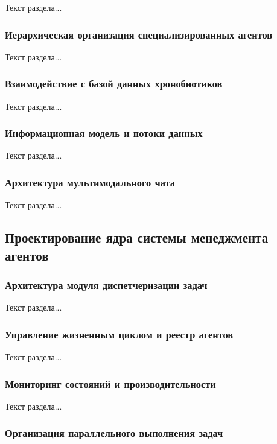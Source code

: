 Текст раздела...

\subsubsection{Иерархическая организация специализированных агентов}

Текст раздела...

\subsubsection{Взаимодействие с базой данных хронобиотиков}

Текст раздела...

\subsubsection{Информационная модель и потоки данных}

Текст раздела...

\subsubsection{Архитектура мультимодального чата}

Текст раздела...

\subsection{Проектирование ядра системы менеджмента агентов}

\subsubsection{Архитектура модуля диспетчеризации задач}

Текст раздела...

\subsubsection{Управление жизненным циклом и реестр агентов}

Текст раздела...

\subsubsection{Мониторинг состояний и производительности}

Текст раздела...

\subsubsection{Организация параллельного выполнения задач}

